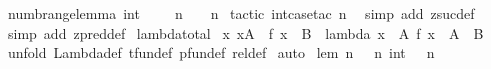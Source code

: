 \begin{isabellebody}
{\isacharverbatimclose}%
\endisatagML
{\isafoldML}%
%
\isadelimML
\isanewline
%
\endisadelimML
\isanewline
{}\isamarkupfalse%
\ numb{\isacharunderscore}range{\isacharunderscore}lemma{\isacharcolon}\ {\isachardoublequoteopen}{\isacharparenleft}{\isacharparenleft}{}{\isacharcolon}{\isacharcolon}int{\isacharparenright}\ {\isachardot}{\isachardot}\ {\isacharhash}\ {\isacharparenleft}{}\ {\isachardot}{\isachardot}\ n{\isacharparenright}{\isacharparenright}\ {\isacharequal}\ {\isacharparenleft}{}\ {\isachardot}{\isachardot}\ n{\isacharparenright}{\isachardoublequoteclose}\isanewline
%
\isadelimproof
%
\endisadelimproof
%
\isatagproof
{}\isamarkupfalse%
\ {\isacharparenleft}tactic\ {\isacharverbatimopen}int{\isacharunderscore}case{\isacharunderscore}tac\ {\isachardoublequote}n{\isachardoublequote}\ {}{\isacharverbatimclose}{\isacharparenright}\isanewline
{}\isamarkupfalse%
\ {\isacharparenleft}simp\ add{\isacharcolon}\ zsuc{\isacharunderscore}def{\isacharparenright}\isanewline
{}\isamarkupfalse%
\ {\isacharparenleft}simp\ add{\isacharcolon}\ zpred{\isacharunderscore}def{\isacharparenright}\isanewline
{}\isamarkupfalse%
%
\endisatagproof
{\isafoldproof}%
%
\isadelimproof
\isanewline
%
\endisadelimproof
\isanewline
{}\isamarkupfalse%
\ lambda{\isacharunderscore}total{}{\isacharcolon}\isanewline
{\isachardoublequoteopen}{\isacharparenleft}{\isacharbang}{\isacharbang}\ x{\isachardot}\ x{\isacharcolon}A\ {\isacharequal}{\isacharequal}{\isachargreater}\ f\ x\ {\isacharcolon}\ B{\isacharparenright}\ {\isacharequal}{\isacharequal}{\isachargreater}\ {\isacharparenleft}lambda\ x\ {\isacharcolon}\ A{\isachardot}\ f\ x{\isacharparenright}\ {\isacharcolon}\ A\ {\isacharminus}{\isacharminus}{\isacharminus}{\isachargreater}\ B{\isachardoublequoteclose}\isanewline
%
\isadelimproof
%
\endisadelimproof
%
\isatagproof
{}\isamarkupfalse%
\ {\isacharparenleft}unfold\ Lambda{\isacharunderscore}def\ tfun{\isacharunderscore}def\ pfun{\isacharunderscore}def\ rel{\isacharunderscore}def{\isacharparenright}\isanewline
{}\isamarkupfalse%
\ auto\isanewline
{}\isamarkupfalse%
%
\endisatagproof
{\isafoldproof}%
%
\isadelimproof
\isanewline
%
\endisadelimproof
\isanewline
{}\isamarkupfalse%
\ lem{}{\isacharcolon}\ {\isachardoublequoteopen}{\isacharbang}{\isacharbang}n{\isachardot}\ {}\ {\isacharless}{\isacharequal}\ n\ {\isacharequal}{\isacharequal}{\isachargreater}int\ {}\ {\isacharless}{\isacharequal}\ n{\isachardoublequoteclose}\isanewline

\end{isabellebody}
